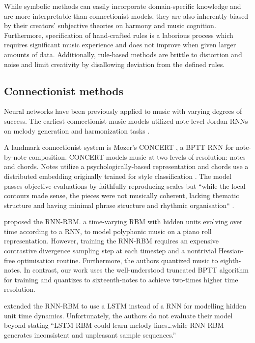 \documentclass[dissertation.tex]{subfiles}
\begin{document}
While symbolic methods can easily incorporate domain-specific knowledge and are
more interpretable than connectionist models, they are also inherently biased
by their creators' subjective theories on harmony and music cognition.
Furthermore, specification of hand-crafted rules is a laborious process which
requires significant music experience and does not improve when given larger
amounts of data. Additionally, rule-based methods are brittle to distortion and
noise and limit creativity by disallowing deviation from the defined rules.

\subsection{Connectionist methods}

Neural networks have been previously applied to music with varying degrees of
success\cite{griffith1999musical}. The earliest connectionist music models
utilized note-level Jordan RNNs on melody generation and harmonization tasks
\cite{todd1988sequential} \cite{todd1989connectionist}
\cite{bharucha1989modeling}. 

A landmark connectionist system is Mozer's CONCERT \cite{mozer1994neural}, a
BPTT RNN for note-by-note composition. CONCERT models music at two
levels of resolution: notes and chords. Notes utilize a psychologically-based
representation \cite{shepard1982geometrical} and chords use a distributed
embedding originally trained for style classification
\cite{laden1989representation}. The model passes objective evaluations by
faithfully reproducing scales but ``while the local contours made sense, the
pieces were not musically coherent, lacking thematic structure and having
minimal phrase structure and rhythmic organisation`` \cite{mozer1994neural}.

\cite{Boulanger-Lewandowski2012} proposed the RNN-RBM. a time-varying RBM with
hidden units evolving over time according to a RNN, to model polyphonic music
on a piano roll representation. However, training the RNN-RBM requires an
expensive contrastive divergence sampling step at each timestep and a
nontrivial Hessian-free optimisation routine. Furthermore, the authors
quantized music to eighth-notes. In contrast, our work uses the well-understood
truncated BPTT algorithm for training and quantizes to sixteenth-notes to achieve
two-times higher time resolution.

\cite{Lyu2015} extended the RNN-RBM\cite{Boulanger-Lewandowski2012} to use a
LSTM instead of a RNN for modelling hidden unit time dynamics. Unfortunately,
the authors do not evaluate their model beyond stating ``LSTM-RBM could learn
melody lines\ldots while RNN-RBM generates inconsistent and unpleasant sample
sequences.''
\end{document}
